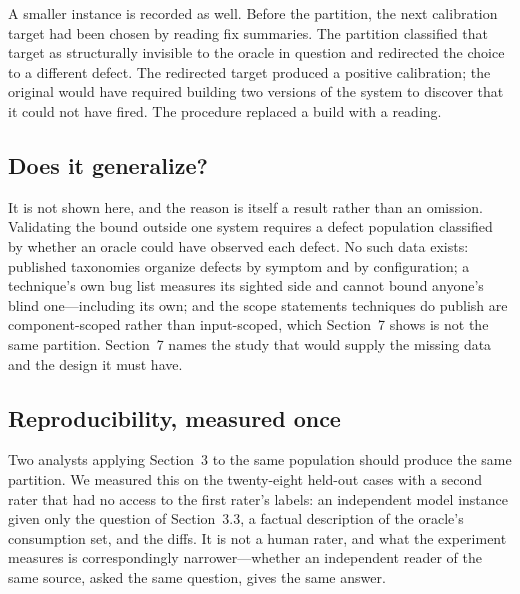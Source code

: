 A smaller instance is recorded as well. Before the partition, the next calibration target had been
chosen by reading fix summaries. The partition classified that target as
structurally invisible to the oracle in question and redirected the choice to a
different defect. The redirected target produced a positive calibration; the
original would have required building two versions of the system to discover that it
could not have fired. The procedure replaced a build with a reading.

\subsection{Does it generalize?}

It is not shown here, and the reason is itself a result rather than an omission.
Validating the bound outside one system requires a defect population classified by
whether an oracle could have observed each defect. No such data exists: published
taxonomies organize defects by symptom and by configuration; a technique's own bug
list measures its sighted side and cannot bound anyone's blind one---including its
own; and the scope statements techniques do publish are component-scoped rather than
input-scoped, which Section~7 shows is not the same partition. Section~7 names the study that would supply the missing data and the design
it must have.

\subsection{Reproducibility, measured once}

Two analysts applying Section~3 to the same population should produce the same
partition. We measured this on the twenty-eight held-out cases with a second rater
that had no access to the first rater's labels: an independent model instance given
only the question of Section~3.3, a factual description of the oracle's consumption
set, and the diffs. It is not a human rater, and what the experiment measures is
correspondingly narrower---whether an independent reader of the same source, asked
the same question, gives the same answer.

